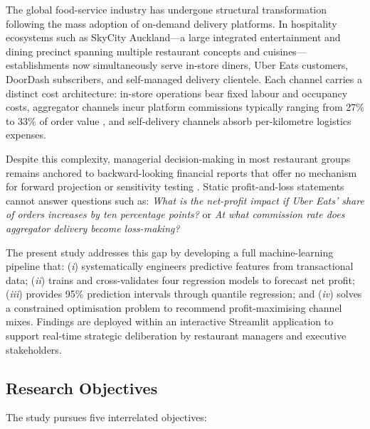 \documentclass[10pt,a4paper,twocolumn]{article}
\begin{document}
The global food-service industry has undergone structural transformation following
the mass adoption of on-demand delivery platforms. In hospitality ecosystems such as
SkyCity Auckland—a large integrated entertainment and dining precinct spanning multiple
restaurant concepts and cuisines—establishments now simultaneously serve in-store diners,
Uber Eats customers, DoorDash subscribers, and self-managed delivery clientele. Each
channel carries a distinct cost architecture: in-store operations bear fixed labour and
occupancy costs, aggregator channels incur platform commissions typically ranging from
27\% to 33\% of order value \citep{breidbach2020platform}, and self-delivery channels
absorb per-kilometre logistics expenses.

Despite this complexity, managerial decision-making in most restaurant groups remains
anchored to backward-looking financial reports that offer no mechanism for forward
projection or sensitivity testing \citep{okumus2020revenue}. Static profit-and-loss
statements cannot answer questions such as: \textit{What is the net-profit impact if
Uber Eats' share of orders increases by ten percentage points?} or \textit{At what
commission rate does aggregator delivery become loss-making?}

The present study addresses this gap by developing a full machine-learning pipeline
that: (\textit{i}) systematically engineers predictive features from transactional data;
(\textit{ii}) trains and cross-validates four regression models to forecast net profit;
(\textit{iii}) provides 95\% prediction intervals through quantile regression; and
(\textit{iv}) solves a constrained optimisation problem to recommend profit-maximising
channel mixes. Findings are deployed within an interactive Streamlit application to
support real-time strategic deliberation by restaurant managers and executive
stakeholders.

\subsection{Research Objectives}

The study pursues five interrelated objectives:
\end{document}
